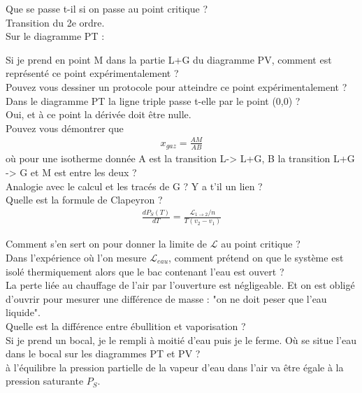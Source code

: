 \documentclass[12pt,prb,aps,epsf]{report}
\begin{document}
Que se passe t-il si on passe au point critique ?\\
Transition du 2e ordre.\\

Sur le diagramme PT : 

Si je prend en point M dans la partie L+G du diagramme PV, comment est représenté ce point expérimentalement ?\\
Pouvez vous dessiner un protocole pour atteindre ce point expérimentalement ?\\

Dans le diagramme PT la ligne triple passe t-elle par le point (0,0) ?\\
Oui, et à ce point la dérivée doit être nulle.\\

Pouvez vous démontrer que 
\begin{eqnarray}
x_{gaz} = \frac{AM}{AB}
\end{eqnarray}
où pour une isotherme donnée A est la transition L-> L+G, B la transition L+G -> G et M est entre les deux ?\\

Analogie avec le calcul et les tracés de G ? Y a t'il un lien ?\\

Quelle est la formule de Clapeyron ?\\
\begin{eqnarray}
\frac{dP_S(T)}{dT} = \frac{\mathcal{L}_{1\rightarrow2}/n}{T(v_2-v_1)}
\end{eqnarray}

Comment s'en sert on pour donner la limite de $\mathcal{L}$ au point critique ?\\

Dans l'expérience où l'on mesure $\mathcal{L}_{eau}$, comment prétend on que le système est isolé thermiquement alors que le bac contenant l'eau est ouvert ?\\
La perte liée au chauffage de l'air par l'ouverture est négligeable. Et on est obligé d'ouvrir pour mesurer une différence de masse : "on ne doit peser que l'eau liquide".\\

Quelle est la différence entre ébullition et vaporisation ?\\

Si je prend un bocal, je le rempli à moitié d'eau puis je le ferme. Où se situe l'eau dans le bocal sur les diagrammes PT et PV ?\\
à l'équilibre la pression partielle de la vapeur d'eau dans l'air va être égale à la pression saturante $P_S$.
\end{document}
